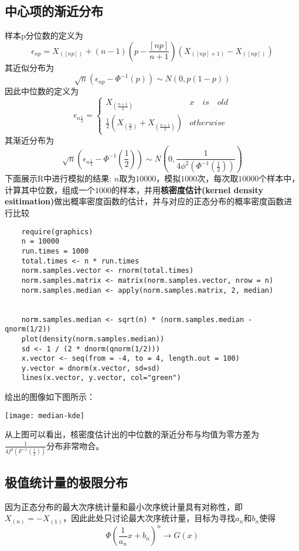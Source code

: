 \documentclass[UTF8]{article}
\begin{document}
	\subsection{中心项的渐近分布}
	样本p分位数的定义为
		$$\epsilon_{np}=X_{([np])} + (n-1)(p-\frac{[np]}{n+1})(X_{([np]+1)}-X_{([np])})$$
		其近似分布为
		$$\sqrt{n}(\epsilon_{np} - \Phi^{-1}(p))\sim N(0, p(1-p))$$
	因此中位数的定义为
	$$\epsilon_{n\frac1{2}} =  \begin{cases} 
		X_{(\frac{n+1}{2})} & x\quad is\quad old \\
		\frac1{2}(X_{(\frac{n}{2})} + X_{(\frac{n+1}{2})}) & otherwise
	\end{cases}
	$$
	其渐近分布为
	$$\sqrt{n}(\epsilon_{n\frac1{2}} - \Phi^{-1}(\frac1{2}))\sim N(0, \frac1{4\phi^2(\Phi^{-1}(\frac1{2}))})$$
	下面展示R中进行模拟的结果:
	$n$取为$10000$，模拟$1000$次，每次取$10000$个样本中，计算其中位数，组成一个$1000$的样本，并用\textbf{核密度估计(kernel density esitimation)}做出概率密度函数的估计，并与对应的正态分布的概率密度函数进行比较
	
	\begin{lstlisting}
	require(graphics)
	n = 10000
	run.times = 1000
	total.times <- n * run.times
	norm.samples.vector <- rnorm(total.times)
	norm.samples.matrix <- matrix(norm.samples.vector, nrow = n)
	norm.samples.median <- apply(norm.samples.matrix, 2, median)
	
	
	norm.samples.median <- sqrt(n) * (norm.samples.median - qnorm(1/2))
	plot(density(norm.samples.median))
	sd <- 1 / (2 * dnorm(qnorm(1/2)))
	x.vector <- seq(from = -4, to = 4, length.out = 100)
	y.vector = dnorm(x.vector, sd=sd)
	lines(x.vector, y.vector, col="green")
	\end{lstlisting}
	
	绘出的图像如下图所示：
	
	\texttt{[image: median-kde]}
	
	从上图可以看出，核密度估计出的中位数的渐近分布与均值为零方差为$\frac1{4f^2(F^{-1}(\frac1{2}))}$分布非常吻合。
	
	\subsection{极值统计量的极限分布}
	因为正态分布的最大次序统计量和最小次序统计量具有对称性，即$X_{(n)}=-X_{(1)}$，因此此处只讨论最大次序统计量，目标为寻找$a_n$和$b_n$使得$$\Phi(\frac1{a_n}x+b_n)^n\rightarrow G(x)$$
	
\end{document}

